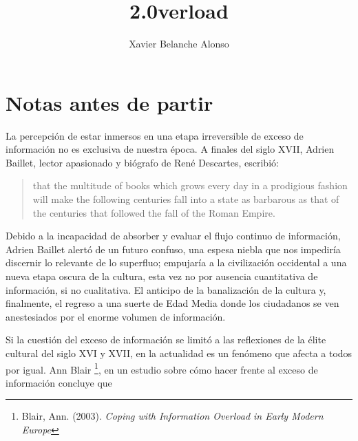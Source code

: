 \documentclass[12pt, a4paper,twoside]{book}
\title{2.0verload}
\author{Xavier Belanche Alonso}
\makeatletter
\let\savedauthor=\@author
\let\savedtitle=\@title
\newcommand{\chap}[1]{\newpage\thispagestyle{empty}\chapter{#1}\label{chap:\thechapter}}
\makeatother
\begin{document}
\frontmatter
\maketitle
\thispagestyle{empty}
\setcounter{tocdepth}{4}
\tableofcontents\newpage\thispagestyle{empty}

\mainmatter
\fancyhf{}
\fancyhead[LO]{{\small\leftmark}}
\fancyhead[LE]{{\small\rightmark}}
\fancyhead[R]{{\small\savedauthor\hspace*{1ex}\textbf{\savedtitle}}}
\fancyfoot[LE,RO]{\small\textbf\thepage}
\pagestyle{fancy}

\chap{Notas antes de partir}

La percepción de estar inmersos en una etapa irreversible de exceso
de información no es exclusiva de nuestra época. A finales del
siglo XVII, Adrien Baillet, lector apasionado y biógrafo de René
Descartes, escribió:

\begin{quote}
that the multitude of books which grows every day in a prodigious
fashion will make the following centuries fall into a state as
barbarous as that of the centuries that followed the fall of the
Roman Empire.

\end{quote}
Debido a la incapacidad de absorber y evaluar el flujo continuo de
información, Adrien Baillet alertó de un futuro confuso, una espesa
niebla que nos impediría discernir lo relevante de lo superfluo;
empujaría a la civilización occidental a una nueva etapa oscura de
la cultura, esta vez no por ausencia cuantitativa de información,
si no cualitativa. El anticipo de la banalización de la cultura y,
finalmente, el regreso a una suerte de Edad Media donde los
ciudadanos se ven anestesiados por el enorme volumen de
información.

Si la cuestión del exceso de información se limitó a las
reflexiones de la élite cultural del siglo XVI y XVII, en la
actualidad es un fenómeno que afecta a todos por igual. Ann Blair%
\footnote{Blair, Ann. (2003).
\emph{Coping with Information Overload in Early Modern Europe}},
en un estudio sobre cómo hacer frente al exceso de información
concluye que
\end{document}
